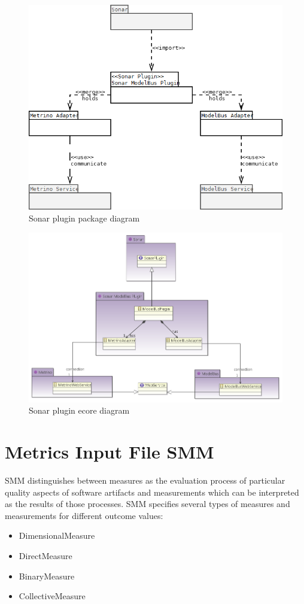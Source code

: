 \begin{figure}[h]
	\centering
		\includegraphics[width=\textwidth]{plugin_package_dia}
	\caption{Sonar plugin package diagram}
	\label{fig:sonarrunning}
\end{figure}

\begin{figure}[h]
	\centering
		\includegraphics[width=\textwidth]{plugin_ecore_dia}
	\caption{Sonar plugin ecore diagram}
	\label{fig:sonarrunning}
\end{figure}


\section{Metrics Input File SMM}
SMM distinguishes between measures as the evaluation process of particular quality aspects of software artifacts and measurements which can be interpreted as the results of those processes. SMM specifies several types of measures and measurements for different outcome values:
\begin{itemize}
\item DimensionalMeasure
\item DirectMeasure
\item BinaryMeasure
\item CollectiveMeasure
\end{itemize}

